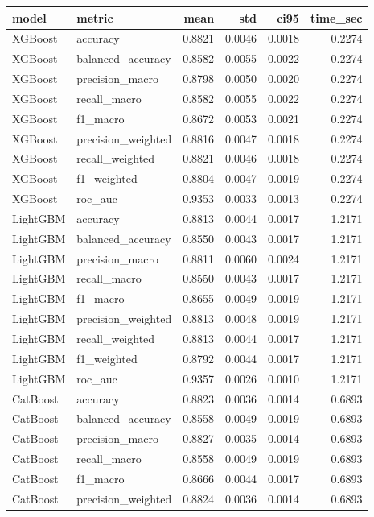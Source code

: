 \begin{tabular}{llrrrr}
\toprule
model & metric & mean & std & ci95 & time_sec \\
\midrule
XGBoost & accuracy & 0.8821 & 0.0046 & 0.0018 & 0.2274 \\
XGBoost & balanced_accuracy & 0.8582 & 0.0055 & 0.0022 & 0.2274 \\
XGBoost & precision_macro & 0.8798 & 0.0050 & 0.0020 & 0.2274 \\
XGBoost & recall_macro & 0.8582 & 0.0055 & 0.0022 & 0.2274 \\
XGBoost & f1_macro & 0.8672 & 0.0053 & 0.0021 & 0.2274 \\
XGBoost & precision_weighted & 0.8816 & 0.0047 & 0.0018 & 0.2274 \\
XGBoost & recall_weighted & 0.8821 & 0.0046 & 0.0018 & 0.2274 \\
XGBoost & f1_weighted & 0.8804 & 0.0047 & 0.0019 & 0.2274 \\
XGBoost & roc_auc & 0.9353 & 0.0033 & 0.0013 & 0.2274 \\
LightGBM & accuracy & 0.8813 & 0.0044 & 0.0017 & 1.2171 \\
LightGBM & balanced_accuracy & 0.8550 & 0.0043 & 0.0017 & 1.2171 \\
LightGBM & precision_macro & 0.8811 & 0.0060 & 0.0024 & 1.2171 \\
LightGBM & recall_macro & 0.8550 & 0.0043 & 0.0017 & 1.2171 \\
LightGBM & f1_macro & 0.8655 & 0.0049 & 0.0019 & 1.2171 \\
LightGBM & precision_weighted & 0.8813 & 0.0048 & 0.0019 & 1.2171 \\
LightGBM & recall_weighted & 0.8813 & 0.0044 & 0.0017 & 1.2171 \\
LightGBM & f1_weighted & 0.8792 & 0.0044 & 0.0017 & 1.2171 \\
LightGBM & roc_auc & 0.9357 & 0.0026 & 0.0010 & 1.2171 \\
CatBoost & accuracy & 0.8823 & 0.0036 & 0.0014 & 0.6893 \\
CatBoost & balanced_accuracy & 0.8558 & 0.0049 & 0.0019 & 0.6893 \\
CatBoost & precision_macro & 0.8827 & 0.0035 & 0.0014 & 0.6893 \\
CatBoost & recall_macro & 0.8558 & 0.0049 & 0.0019 & 0.6893 \\
CatBoost & f1_macro & 0.8666 & 0.0044 & 0.0017 & 0.6893 \\
CatBoost & precision_weighted & 0.8824 & 0.0036 & 0.0014 & 0.6893 \\

\end{tabular}

